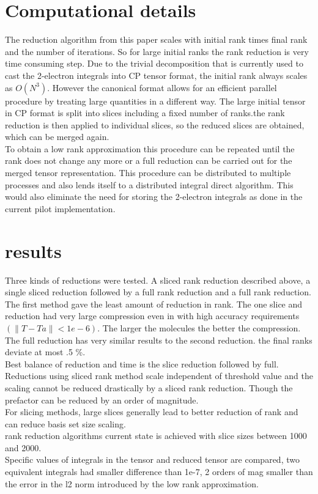 \documentclass[10pt, draft]{article}
\begin{document}
 \section{Computational details}
 The reduction algorithm from this paper scales with initial rank times final rank and the number of iterations.  So for large initial ranks the rank reduction is very time consuming step.  Due to the trivial decomposition that is currently used to cast the 2-electron integrals into CP tensor format, the initial rank always scales as $O(N^3)$.  However the canonical format allows for an efficient parallel procedure by treating large quantities in a different way.  The large initial tensor in CP format is split into slices including a fixed number of ranks.the rank reduction is then applied to individual slices, so the reduced slices are obtained, which can be merged again. \\
 To obtain a low rank approximation this procedure can be repeated until the rank does not change any more or a full reduction can be carried out for the merged tensor representation.  This procedure can be distributed to multiple processes and also lends itself to a distributed integral direct algorithm.  This would also eliminate the need for storing the 2-electron integrals as done in the current pilot implementation.
 
 \section{results}
 Three kinds of reductions were tested.  A sliced rank reduction described above, a single sliced reduction followed by a full rank reduction and a full rank reduction.   The first method gave the least amount of reduction in rank. The one slice and reduction had very large compression even in with high accuracy requirements $(\|T-Ta \| < 1e-6)$. The larger the molecules the better the compression. The full reduction has very similar results to the second reduction.  the final ranks deviate at most .5 \%.  \\
 Best balance of reduction and time is the slice reduction followed by full.  \\
 Reductions using sliced rank method scale independent of threshold value and the scaling cannot be reduced drastically by a sliced rank reduction. Though the prefactor can be reduced by an order of magnitude.  \\
 For slicing methods, large slices generally lead to better reduction of rank and can reduce basis set size scaling.  \\
 rank reduction algorithms current state is achieved with slice sizes between 1000 and 2000. \\
 Specific values of integrals in the tensor and reduced tensor are compared, two equivalent integrals had smaller difference than 1e-7, 2 orders of mag smaller than the error in the l2 norm introduced by the low rank approximation.  \linebreak[1]
 
\end{document}
